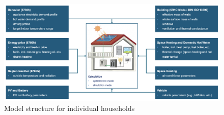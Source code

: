 


%


\begin{figure}[h!]
  \centering
  \includegraphics[width=\textwidth]{Images/flex-operation.png}
  \caption{Model structure for individual households}
  \label{fig:flex-operation}
\end{figure}

